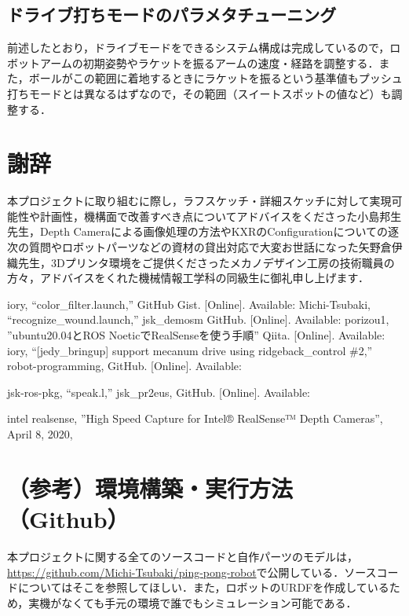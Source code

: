 \documentclass[10pt, oneside, titlepage]{ltjarticle}  %
\begin{document}
\subsection{ドライブ打ちモードのパラメタチューニング}
前述したとおり，ドライブモードをできるシステム構成は完成しているので，ロボットアームの初期姿勢やラケットを振るアームの速度・経路を調整する．また，ボールがこの範囲に着地するときにラケットを振るという基準値もプッシュ打ちモードとは異なるはずなので，その範囲（スイートスポットの値など）も調整する．

\section{謝辞}
本プロジェクトに取り組むに際し，ラフスケッチ・詳細スケッチに対して実現可能性や計画性，機構面で改善すべき点についてアドバイスをくださった小島邦生先生，Depth Cameraによる画像処理の方法やKXRのConfigurationについての逐次の質問やロボットパーツなどの資材の貸出対応で大変お世話になった矢野倉伊織先生，3Dプリンタ環境をご提供くださったメカノデザイン工房の技術職員の方々，アドバイスをくれた機械情報工学科の同級生に御礼申し上げます．


\begin{thebibliography}{9}
iory, ``color\_filter.launch,'' GitHub Gist. [Online]. Available: 
Michi-Tsubaki, ``recognize\_wound.launch,'' jsk\_demosm GitHub. [Online]. Available: 
porizou1, ''ubuntu20.04とROS NoeticでRealSenseを使う手順'' Qiita. [Online]. Available: 
iory, ``[jedy\_bringup] support mecanum drive using ridgeback\_control \#2,'' robot-programming, GitHub. [Online]. Available: 

jsk-ros-pkg, ``speak.l,'' jsk\_pr2eus, GitHub. [Online]. Available: 

intel realsense, ''High Speed Capture for Intel® RealSense™ Depth Cameras'', April 8, 2020,
\end{thebibliography}
\dotfill
\section{（参考）環境構築・実行方法（Github）}
本プロジェクトに関する全てのソースコードと自作パーツのモデルは， \url{https://github.com/Michi-Tsubaki/ping-pong-robot}で公開している．ソースコードについてはそこを参照してほしい．また，ロボットのURDFを作成しているため，実機がなくても手元の環境で誰でもシミュレーション可能である．
\end{document}
